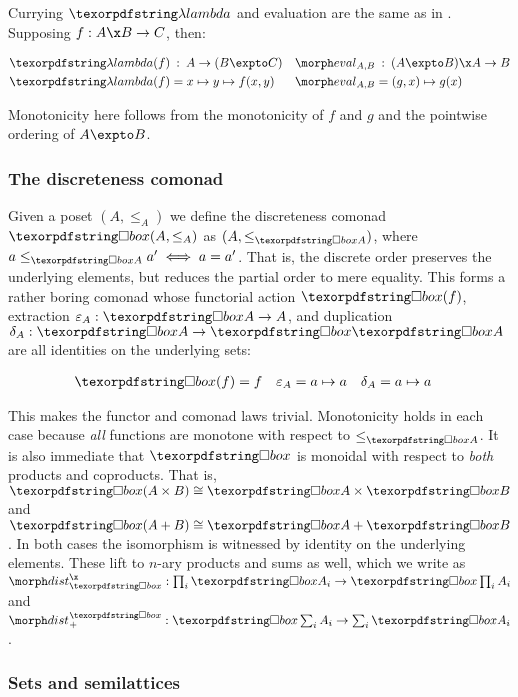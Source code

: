\noindent
Currying $\fn$ and evaluation are the same as in \Set. Supposing $f : A \x B \to
C$, then:

\begin{align*}
  \fn(f) &\isa A \to (B \expto C) &
  \eval_{A,B} &\isa (A \expto B) \x A \to B
  \\
  \fn(f) &= x \mapsto y \mapsto f(x,y) &
  \eval_{A,B} &= (g,x) \mapsto g(x)
\end{align*}

\noindent
Monotonicity here follows from the monotonicity of $f$ and $g$ and the pointwise
ordering of $A \expto B$.


\subsubsection{The discreteness comonad}

Given a poset $(A, \le_A)$ we define the discreteness comonad $\iso(A, \le_A)$
as $(A, \le_{\iso A})$, where \( a \le_{\iso A} a' \iff a = a' \).
%
That is, the discrete order preserves the underlying elements, but reduces the
partial order to mere equality.
%
This forms a rather boring comonad whose functorial action $\iso(f)$, extraction $\varepsilon_A : \iso A \to A$, and duplication $\delta_A : \iso A \to \iso \iso A$ are all identities on the underlying sets:

\begin{align*}
  \iso(f) &= f & \varepsilon_A &= a \mapsto a & \delta_A &= a \mapsto a
\end{align*}

\noindent
This makes the functor and comonad laws trivial. Monotonicity holds in each case because \emph{all} functions are monotone with respect to $\le_{\iso A}$.
%
It is also immediate that $\iso$ is monoidal with respect to \emph{both}
products and coproducts. That is, $\iso (A \times B) \cong \iso A \times \iso B$
and $\iso (A + B) \cong \iso A + \iso B$.
%
In both cases the isomorphism is witnessed by identity on the underlying
elements.
%
These lift to $n$-ary products and sums as well, which we write as $\isox : \prod_i \iso A_i \to \iso\prod_i A_i$ and $\isosum : \iso \sum_i
A_i \to \sum_i \iso A_i$.


\subsubsection{Sets and semilattices}

